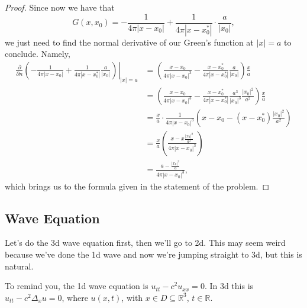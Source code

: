 \begin{proof}
	Since now we have that
	\[ G(x, x_{0}) = - \frac{1}{4 \pi |x - x_{0}|} + \frac{1}{4 \pi |x - x_{0}^{*}|} \cdot \frac{a}{|x_{0}|}, \]
	we just need to find the normal derivative of our Green's function at \( |x| = a \) to conclude. Namely,
	\begin{align*}
		\frac{\partial}{\partial n} \left. \left( - \frac{1}{4 \pi |x - x_{0}|} + \frac{1}{4 \pi |x - x_{0}^{*}|} \frac{a}{|x_{0}|} \right) \right|_{|x| = a} &= \left( \frac{x - x_{0}}{4 \pi |x - x_{0}|^{3}} - \frac{x - x_{0}^{*}}{4 \pi |x - x_{0}^{*}|} \frac{a}{|x_{0}|} \right) \frac{x}{a} \\
																																																																																&= \left( \frac{x - x_{0}}{4 \pi |x - x_{0}|^{3}} - \frac{x - x_{0}^{*}}{4 \pi |x - x_{0}^{*}|} \frac{a^{3}}{|x_{0}|^{3}} \frac{|x_{0}|^{2}}{a^{2}} \right) \frac{x}{a} \\
																																																																																&= \frac{x}{a} \cdot \frac{1}{4 \pi |x - x_{0}|^{3}} \left( x - x_{0} - (x - x_{0}^{*}) \frac{|x_{0}|^{2}}{a^{2}} \right) \\
																																																																																&= \frac{x}{a} \left( \frac{x - x \frac{|x_{0}|^{2}}{a^{2}}}{4 \pi |x - x_{0}|^{3}} \right) \\
																																																																																&= \frac{a - \frac{|x_{0}|^{2}}{a}}{4 \pi |x - x_{0}|^{3}},
	\end{align*}
	which brings us to the formula given in the statement of the problem.
\end{proof}

\subsection{Wave Equation}
Let's do the 3d wave equation first, then we'll go to 2d. This may seem weird because we've done the 1d wave and now we're jumping straight to 3d, but this is natural.

To remind you, the 1d wave equation is \( u_{t t} - c^{2} u_{x x} = 0 \). In 3d this is \( u_{t t} - c^{2} \Delta_{x} u = 0 \), where \( u(x, t) \), with \( x \in D \subseteq \mathbb{R}^{3} \), \( t \in \mathbb{R} \). 

